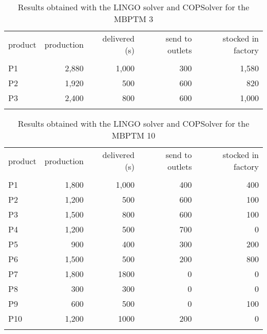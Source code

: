 \documentclass[authoryear,manuscript,12pt]{elsarticle}
\begin{document}
\begin{table}[h]
\begin{center}
\begin{footnotesize}
\begin{tabular}[c]{l r r r r}
product & production & delivered (s) & send to outlets & stocked in factory \\
\cline {1-5} \\
P1 & 2,880 & 1,000 & 300 & 1,580 \\
P2 & 1,920 & 500 & 600 & 820 \\
P3 & 2,400 & 800 & 600 & 1,000 \\
\cline {1-5} \\
\end{tabular}
\caption{Results obtained with the LINGO solver and COPSolver for the MBPTM 3}
\label{tab:compResultsMBPTMP2}
\end{footnotesize}
\end{center}
\end{table}

\begin{table}[h]
\begin{center}
\begin{footnotesize}
\begin{tabular}[c]{l r r r r}
product & production & delivered (s) & send to outlets & stocked in factory \\
\cline {1-5} \\
P1 & 1,800 & 1,000 & 400 & 400 \\
P2 & 1,200 & 500 & 600 & 100 \\
P3 & 1,500 & 800 & 600 & 100 \\
P4 & 1,200 & 500 & 700 & 0 \\
P5 & 900 & 400 & 300 & 200 \\
P6 & 1,500 & 500 & 200 & 800 \\
P7 & 1,800 & 1800 & 0 & 0 \\
P8 & 300 & 300 & 0 & 0 \\
P9 & 600 & 500 & 0 & 100 \\
P10 & 1,200 & 1000 & 200 & 0 \\
\cline {1-5} \\
\end{tabular}
\caption{Results obtained with the LINGO solver and COPSolver for the MBPTM 10}
\label{tab:compResultsMBPTMP3}
\end{footnotesize}
\end{center}
\end{table}
\end{document}
